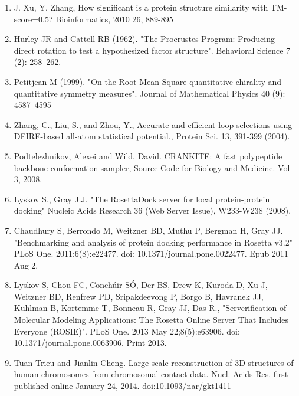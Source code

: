 \documentclass{article}
\begin{document}
\begin{enumerate}
\item J. Xu, Y. Zhang, How significant is a protein structure similarity with TM-score=0.5? Bioinformatics, 2010 26, 889-895

\item Hurley JR and Cattell RB (1962). "The Procrustes Program: Producing direct rotation to test a hypothesized factor structure". Behavioral Science 7 (2): 258–262.

\item Petitjean M (1999). "On the Root Mean Square quantitative chirality and quantitative symmetry measures". Journal of Mathematical Physics 40 (9): 4587–4595

\item Zhang, C., Liu, S., and Zhou, Y., Accurate and efficient loop selections using DFIRE-based all-atom statistical potential., Protein Sci. 13, 391-399 (2004).

\item Podtelezhnikov, Alexei and Wild, David.  CRANKITE: A fast polypeptide backbone conformation sampler, Source Code for Biology and Medicine.  Vol 3, 2008.

\item Lyskov S., Gray J.J. "The RosettaDock server for local protein-protein docking" Nucleic Acids Research 36 (Web Server Issue), W233-W238 (2008).

\item Chaudhury S, Berrondo M, Weitzner BD, Muthu P, Bergman H, Gray JJ. "Benchmarking and analysis of protein docking performance in Rosetta v3.2" PLoS One. 2011;6(8):e22477. doi: 10.1371/journal.pone.0022477. Epub 2011 Aug 2.

\item Lyskov S, Chou FC, Conchúir SÓ, Der BS, Drew K, Kuroda D, Xu J, Weitzner BD, Renfrew PD, Sripakdeevong P, Borgo B, Havranek JJ, Kuhlman B, Kortemme T, Bonneau R, Gray JJ, Das R., "Serverification of Molecular Modeling Applications: The Rosetta Online Server That Includes Everyone (ROSIE)". PLoS One. 2013 May 22;8(5):e63906. doi: 10.1371/journal.pone.0063906. Print 2013.

\item Tuan Trieu and Jianlin Cheng.  Large-scale reconstruction of 3D structures of human chromosomes from chromosomal contact data.  Nucl. Acids Res. first published online January 24, 2014. doi:10.1093/nar/gkt1411

\end{enumerate}
\end{document}
